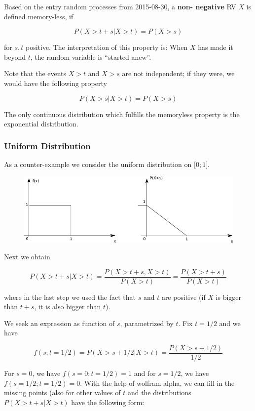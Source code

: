 
Based on the entry random processes from 2015-08-30, a \textbf{non- negative} RV $X$ is defined memory-less, if

\[ P(X>t+s|X>t) = P(X>s)\]

for $s, t$ positive. The interpretation of this property is: When $X$ has made it beyond $t$, the random variable is ``started anew''.

Note that the events $X>t$ and $X>s$ are not independent; if they were, we would have the following property

\[ P(X>s|X>t) = P(X>s)\]

The only continuous distribution which fulfills the memoryless property is the exponential distribution.

\subsubsection{Uniform Distribution}

As a counter-example we consider the uniform distribution on
${[}0;1{]}$.

\begin{figure}[H]
\includegraphics[scale=0.7]{images/memory_less_1.png}
\end{figure}

Next we obtain

\[ P(X>t+s|X>t) = \frac{P(X>t+s, X>t)}{P(X>t)} = \frac{P(X>t+s)}{P(X>t)} \]

where in the last step we used the fact that $s$ and $t$ are positive (if $X$ is bigger than $t+s$, it is also bigger than $t$).

We seek an expression as function of $s$, parametrized by $t$. Fix $t=1/2$ and we have

\[ f(s; t=1/2) = P(X>s+1/2|X>t) = \frac{P(X>s+1/2)}{1/2} \]

For $s=0$, we have $f(s=0; t=1/2)=1$ and for $s=1/2$, we have $f(s=1/2; t=1/2)=0$. With the help of wolfram alpha, we can fill in the missing points (also for other values of $t$ and the distributions $P(X>t+s|X>t)$ have the following form:

